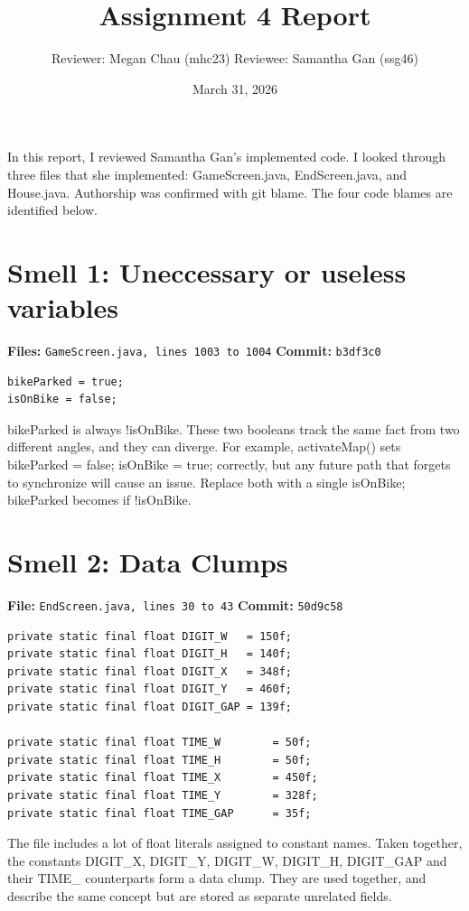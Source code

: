 \documentclass[10pt]{article}
\title{\textbf{Assignment 4 Report} \\[4pt]}
\author{Reviewer: Megan Chau (mhc23) \quad Reviewee: Samantha Gan (ssg46) }
\date{March 31, 2026}
\begin{document}
\maketitle

In this report, I reviewed Samantha Gan’s implemented code. I looked through three files that she implemented: GameScreen.java, EndScreen.java, and House.java. Authorship was confirmed with git blame. The four code blames are identified below. 

\section{Smell 1: Uneccessary or useless variables}

\textbf{Files:} \texttt{GameScreen.java, lines 1003 to 1004}  \quad
\textbf{Commit:} \texttt{b3df3c0}

\begin{lstlisting}
bikeParked = true;
isOnBike = false;
\end{lstlisting}

bikeParked is always !isOnBike. These two booleans track the same fact from two different angles, and they can diverge. For example, activateMap() sets bikeParked = false; isOnBike = true; correctly, but any future path that forgets to synchronize will cause an issue. Replace both with a single isOnBike; bikeParked becomes if !isOnBike.

\section{Smell 2: Data Clumps}

\textbf{File:} \texttt{EndScreen.java, lines 30 to 43} \quad
\textbf{Commit:} \texttt{50d9c58}

\begin{lstlisting}
private static final float DIGIT_W   = 150f;
private static final float DIGIT_H   = 140f;
private static final float DIGIT_X   = 348f; 
private static final float DIGIT_Y   = 460f; 
private static final float DIGIT_GAP = 139f;  

private static final float TIME_W        = 50f;
private static final float TIME_H        = 50f;
private static final float TIME_X        = 450f; 
private static final float TIME_Y        = 328f; 
private static final float TIME_GAP      = 35f; 
\end{lstlisting}

The file includes a lot of float literals assigned to constant names. Taken together, the constants DIGIT\_X, DIGIT\_Y, DIGIT\_W, DIGIT\_H, DIGIT\_GAP and their TIME\_ counterparts form a data clump. They are used together, and describe the same concept but are stored as separate unrelated fields. 
\end{document}

